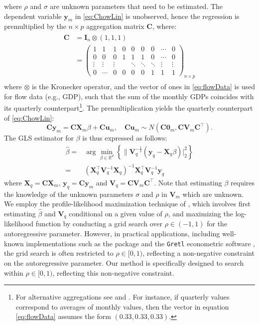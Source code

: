 where \(\rho\) and \(\sigma\) are unknown parameters that need to be estimated. The dependent variable \(\mathbf{y}_m\) in \eqref{eq:ChowLin} is unobserved, hence the regression is premultiplied by the \(n\times p\) aggregation matrix \(\mathbf{C}\), where:
\begin{align}
\begin{split}
\mathbf{C}&=\mathbf{I}_n\otimes (1,1,1)\\
&=
\begin{pmatrix}
1&1&1&0&0&0&0&\cdots &0\\
0&0&0 & 1&1&1&0&\cdots &0\\
\vdots&\vdots&\vdots & &\ddots&\ddots&\ddots&\vdots &\vdots\\
0&\cdots&0&0&0&0&1&1 &1
\end{pmatrix}_{n\times p}
\end{split}
\label{eq:flowData}
\end{align}
where \(\otimes\) is the Kronecker operator, and the vector of ones in \eqref{eq:flowData} is used for flow data (e.g., GDP), such that the sum of the monthly GDPs coincides with its quarterly counterpart\footnote{For alternative aggregations see \citet{quilis2018temporal} and \citet{sax2016package}. For instance, if quarterly values correspond to averages of monthly values, then the vector in equation \eqref{eq:flowData} assumes the form \((0.33,0.33,0.33)\).}. The premultiplication yields the quarterly counterpart of \eqref{eq:ChowLin}:
\begin{equation}
\mathbf{C}\mathbf{y}_m=\mathbf{C}\mathbf{X}_m\beta+\mathbf{C}\mathbf{u}_m,\quad \mathbf{C}\mathbf{u}_m\sim N(\mathbf{C}\mathbf{0}_m,\mathbf{C}\mathbf{V}_m\mathbf{C}^{\top}).
\end{equation}
The GLS estimator for \(\beta\) is thus expressed as follows:
\begin{align}
\hat{\beta}=&\arg\min_{\beta\in\mathbb{R}^d}\left\{\Big\lVert \mathbf{V}_q^{-\frac{1}{2}}(\mathbf{y}_q-\mathbf{X}_q\beta)\Big\rvert_2^2\right\}
\label{eq:CostFunction}\\
=&\left(\mathbf{X}_q^{\top}\mathbf{V}_q^{-1}\mathbf{X}_q\right)^{-1}\mathbf{X}_q^{\top}\mathbf{V}_q^{-1}\mathbf{y}_q
\label{eq:GLSEstimator}
\end{align}
where \(\mathbf{X}_q=\mathbf{CX}_m\), \(\mathbf{y}_q=\mathbf{Cy}_m\) and \(\mathbf{V}_q=\mathbf{C}\mathbf{V}_m\mathbf{C}^{\top}\). Note that estimating \(\beta\) requires the knowledge of the unknown parameters \(\sigma\) and \(\rho\) in \(\mathbf{V}_m\) which are unknown. We employ the profile-likelihood maximization technique of \citet{bournay1979reflexions}, which involves first estimating \(\hat{\beta}\) and \(\mathbf{V}_q\) conditional on a given value of \(\rho\), and maximizing the log-likelihood function by conducting a grid search over \(\rho \in (-1, 1)\) for the autoregressive parameter. However, in practical applications, including well-known implementations such as the  package and the \texttt{Gretl} econometric software \citet{cottrell2023gretl}, the grid search is often restricted to \(\rho \in [0, 1)\), reflecting a non-negative constraint on the autoregressive parameter. Our method is specifically designed to search within \(\rho \in [0, 1)\), reflecting this non-negative constraint.

